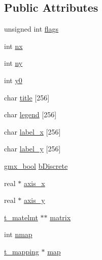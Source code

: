 \subsection*{\-Public \-Attributes}
\begin{DoxyCompactItemize}
\item 
unsigned int \hyperlink{structt__matrix_abcfcc4494b84c1a4675f173fce6c02b0}{flags}
\item 
int \hyperlink{structt__matrix_a8c1f07c1449e916157db82173b3401d6}{nx}
\item 
int \hyperlink{structt__matrix_a4d35a3da552693f1ee7fdfef594c4205}{ny}
\item 
int \hyperlink{structt__matrix_a2aa97901a5cd73b954f861da0e27aa5a}{y0}
\item 
char \hyperlink{structt__matrix_a2804ac69c08383f0e8aa548bab73a1d5}{title} \mbox{[}256\mbox{]}
\item 
char \hyperlink{structt__matrix_a653249dc3907358d2c06098f5fa54ebd}{legend} \mbox{[}256\mbox{]}
\item 
char \hyperlink{structt__matrix_abcc1df7c7cf4b14b72cd9fe0092c5889}{label\-\_\-x} \mbox{[}256\mbox{]}
\item 
char \hyperlink{structt__matrix_a7b0f03b1d3cbb8ba387c47a8b4a9d69c}{label\-\_\-y} \mbox{[}256\mbox{]}
\item 
\hyperlink{include_2types_2simple_8h_a8fddad319f226e856400d190198d5151}{gmx\-\_\-bool} \hyperlink{structt__matrix_ac0c2d5aadb4d33433e611deaddc2fd6b}{b\-Discrete}
\item 
real $\ast$ \hyperlink{structt__matrix_ad3a481279aeda7b10de72bedd35a6ef6}{axis\-\_\-x}
\item 
real $\ast$ \hyperlink{structt__matrix_ad30bb2cd7913d8fcc8dda043d6be8edb}{axis\-\_\-y}
\item 
\hyperlink{include_2types_2matrix_8h_aa83c808690a6c78238569bf8d14eb60a}{t\-\_\-matelmt} $\ast$$\ast$ \hyperlink{structt__matrix_a624befd4df2db20f7f888e5ec7bfac20}{matrix}
\item 
int \hyperlink{structt__matrix_abcceb71cfda4197e42b8da0cf59c2d61}{nmap}
\item 
\hyperlink{structt__mapping}{t\-\_\-mapping} $\ast$ \hyperlink{structt__matrix_ac7aaae923de6278d7427d79a5674439d}{map}
\end{DoxyCompactItemize}


